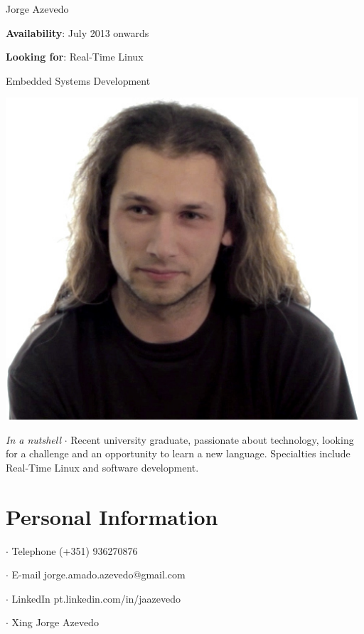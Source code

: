 



\topSection
{
	{\Huge Jorge Azevedo}

	\vspace{1.5mm}
	\vspace*{10mm}

	\textbf{Availability}: July 2013 onwards

	\textbf{Looking for}: Real-Time Linux

	\hspace{66pt}Embedded Systems Development
} {
	\includegraphics[width=0.985\textwidth]{img/photo}
}

\emph{In a nutshell} $\cdot$  Recent university graduate, passionate about
technology, looking for a challenge and an opportunity to learn a new language.
Specialties include Real-Time Linux and software development.

\section*{Personal Information}

{
 $\cdot$  Telephone (+351) 936270876

 $\cdot$  E-mail jorge.amado.azevedo@gmail.com

 $\cdot$  LinkedIn pt.linkedin.com/in/jaazevedo

 $\cdot$  Xing Jorge Azevedo
}

